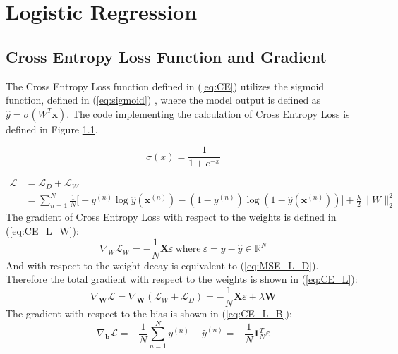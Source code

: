 \documentclass{article}
\newcommand{\R}{\mathbb{R}}
\begin{document}
\section{Logistic Regression}
\subsection{Cross Entropy Loss Function and Gradient}
The Cross Entropy Loss function defined in (\ref{eq:CE}) utilizes the sigmoid function, defined in  (\ref{eq:sigmoid}) , where the model output is defined as $\hat{y}=\sigma(W^T\mathbf{x})$. The code implementing the calculation of Cross Entropy Loss is defined in Figure \ref{}. 

\begin{equation} \label{eq:sigmoid}
    \sigma(x)=\frac{1}{1+e^{-x}}
\end{equation}

\begin{equation} \label{eq:CE}
    \begin{split}
        \mathcal{L} & = \mathcal{L}_D + \mathcal{L}_W \\
          & = \sum_{n=1}^{N} \frac{1}{N} 
          \Big[-y^{(n)}\log\hat{y}(\mathbf{x}^{(n)}) 
          - (1-y^{(n)})\log(1-\hat{y}(\mathbf{x}^{(n)})) \Big] + 
          \frac{\lambda}{2} \lVert W \rVert_{2}^{2}
    \end{split}
\end{equation}
The gradient of Cross Entropy Loss with respect to the weights is defined in (\ref{eq:CE_L_W}):
\begin{equation} \label{eq:CE_L_W}
    \nabla_{W}\mathcal{L}_W = -\frac{1}{N}\mathbf{X}\varepsilon \ \textrm{where} \ \varepsilon=y-\hat{y} \in \R^N
\end{equation}
And with respect to the weight decay is equivalent to (\ref{eq:MSE_L_D}). Therefore the total gradient with respect to the weights is shown in (\ref{eq:CE_L}):
\begin{equation} \label{eq:CE_L}
    \nabla_{\mathbf{W}}\mathcal{L} = \nabla_\mathbf{W}(\mathcal{L}_W + \mathcal{L}_D) = -\frac{1}{N}\mathbf{X}\varepsilon + \lambda \mathbf{W}
\end{equation}
The gradient with respect to the bias is shown in (\ref{eq:CE_L_B}):
\begin{equation} \label{eq:CE_L_B}
    \nabla_{\mathbf{b}}\mathcal{L} =
    -\frac{1}{N}\sum_{n=1}^{N} y^{(n)} - \hat{y}^{(n)}
    = -\frac{1}{N}\mathbf{1}_N^T\varepsilon
\end{equation}
\end{document}
